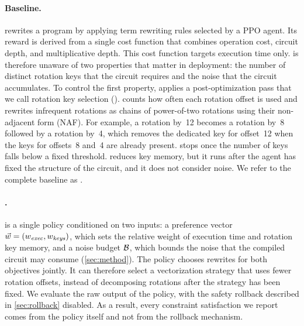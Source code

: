 \paragraph{Baseline.}
\chehabrl{} rewrites a program by applying term rewriting rules selected by a
PPO agent. Its reward is derived from a single cost function that combines
operation cost, circuit depth, and multiplicative depth. This cost function
targets execution time only. \chehabrl{} is therefore unaware of two
properties that matter in deployment: the number of distinct rotation keys
that the circuit requires and the noise that the circuit accumulates. To
control the first property, \chehabrl{} applies a post-optimization pass that
we call rotation key selection (\rks{}). \rks{} counts how often each
rotation offset is used and rewrites infrequent rotations as chains of
power-of-two rotations using their non-adjacent form (NAF). For example, a
rotation by~12 becomes a rotation by~8 followed by a rotation by~4, which
removes the dedicated key for offset~12 when the keys for offsets~8 and~4 are
already present. \rks{} stops once the number of keys falls below a fixed
threshold. \rks{} reduces key memory, but it runs after the agent has fixed
the structure of the circuit, and it does not consider noise. We refer to the
complete baseline as \baseline{}.

\paragraph{\cmorl{}.}
\cmorl{} is a single policy conditioned on two inputs: a preference vector
$\vec{w} = (w_{\mathit{exec}}, w_{\mathit{keys}})$, which sets the relative weight of execution
time and rotation key memory, and a noise budget $\mathcal{B}$, which bounds the
noise that the compiled circuit may consume (\cref{sec:method}). The policy
chooses rewrites for both objectives jointly. It can therefore select a
vectorization strategy that uses fewer rotation offsets, instead of
decomposing rotations after the strategy has been fixed. We evaluate the raw
output of the policy, with the safety rollback described in
\cref{sec:rollback} disabled. As a result, every constraint satisfaction we
report comes from the policy itself and not from the rollback mechanism.

